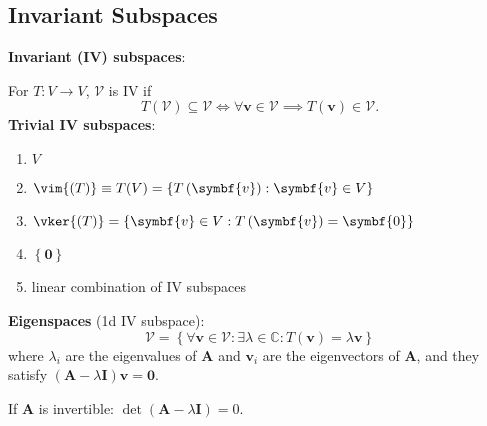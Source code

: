\documentclass{article}
\begin{document}
\begin{minipage}[t]{126.1962963mm}
\begin{multicols*}{2}
        \section*{Invariant Subspaces}
        \textbf{Invariant (IV) subspaces}:

        For \(T:V\rightarrow V\), \(\mathcal{V}\) is IV if
        \begin{equation*}
            T\left(\mathcal{V}\right)\subseteq \mathcal{V}\iff\forall \symbf{v}
            \in \mathcal{V}\implies T\left(\symbf{v}\right)\in \mathcal{V}.
        \end{equation*}
        \textbf{Trivial IV subspaces}:
        \begin{enumerate}
            \item \(V\)
            \item \(\vim{\left( T \right)} \equiv T(V) = \left\{ T\left(\symbf{v}\right) : \symbf{v}\in V \right\}\)
            \item \(\vker{\left( T \right)} = \left\{ \symbf{v}\in V : T\left(\symbf{v}\right) = \symbf{0} \right\}\)
            \item \(\left\{ \symbf{0} \right\}\)
            \item linear combination of IV subspaces
        \end{enumerate}
        \textbf{Eigenspaces} (1d IV subspace):
        \begin{equation*}
            \mathcal{V} = \left\{ \forall \symbf{v}\in \mathcal{V}:\exists
            \lambda \in \mathbb{C}:T\left(\symbf{v}\right) = \lambda \symbf{v} \right\}
        \end{equation*}
        where \(\lambda_i\) are the eigenvalues of \(\symbf{A}\) and
        \(\symbf{v}_i\) are the eigenvectors of \(\symbf{A}\), and they satisfy
        \(\left( \symbf{A} - \lambda \symbf{I} \right) \symbf{v}=\symbf{0}\).

        If \(\symbf{A}\) is invertible:
        \(\det{\left( \symbf{A} - \lambda\symbf{I} \right)} = 0\).


\end{multicols*}
\end{minipage}
\end{document}

